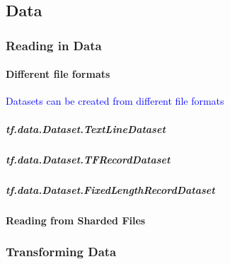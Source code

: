 \subsection{Data}

\subsubsection{Reading in Data}

\paragraph{Different file formats}
\textcolor{blue}{Datasets can be created from different file formats}


\subparagraph{tf.data.Dataset.TextLineDataset}


\subparagraph{tf.data.Dataset.TFRecordDataset}


\subparagraph{tf.data.Dataset.FixedLengthRecordDataset}




\paragraph{Reading from Sharded Files}




\subsubsection{Transforming Data}
